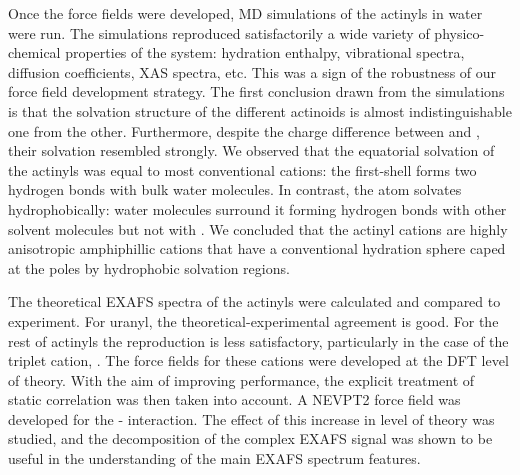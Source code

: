 Once the force fields were developed, MD simulations of the actinyls in water were 
run. The simulations reproduced satisfactorily a wide variety of physico-chemical properties of the 
system: hydration enthalpy, vibrational spectra, diffusion coefficients, XAS spectra, etc. This 
was 
a sign of the robustness of our force field development strategy.  The first conclusion drawn from 
the simulations is that the solvation structure of the 
different actinoids is almost indistinguishable one from the other. Furthermore, despite the 
charge difference between  and \ce{[NpO2]^{+}}, their solvation resembled strongly. 
We observed that the equatorial solvation of the actinyls was equal to most 
conventional cations: 
the first-shell forms two hydrogen bonds with bulk water molecules. In contrast, the \oyl atom 
solvates hydrophobically: water \newline molecules surround it forming hydrogen bonds with 
other 
solvent molecules but not with \oyl. We concluded that the actinyl cations are highly anisotropic 
amphiphillic cations that have a conventional hydration sphere caped at the poles by hydrophobic 
solvation regions. 

The theoretical EXAFS spectra of the actinyls were  calculated and compared to experiment. 
For uranyl, the theoretical-experimental agreement is good. For the rest of actinyls the 
reproduction is less satisfactory, particularly in the case of the triplet 
cation, . The force fields 
for these
cations were developed at the DFT level of theory. With the aim of improving performance, the 
explicit treatment of static correlation was then taken into account. A 
NEVPT2\cite{NEVPT2_1,NEVPT2_2,NEVPT2_3} force field was developed for the 
- interaction. The effect of this increase in level of theory was 
studied, and the decomposition of 
the complex EXAFS signal was shown to be useful in the understanding of the main EXAFS spectrum 
features. 

